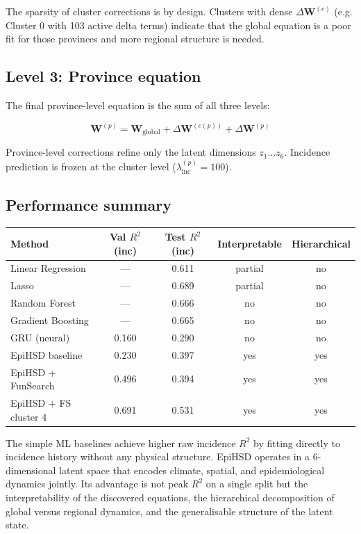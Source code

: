 \documentclass{article}
\begin{document}
The sparsity of cluster corrections is by design. Clusters with dense $\Delta\mathbf{W}^{(c)}$
(e.g. Cluster 0 with 103 active delta terms) indicate that the global equation is a poor
fit for those provinces and more regional structure is needed.

\subsection*{Level 3: Province equation}

The final province-level equation is the sum of all three levels:

\begin{equation}
    \mathbf{W}^{(p)}
    = \mathbf{W}_{\text{global}}
    + \Delta\mathbf{W}^{(c(p))}
    + \Delta\mathbf{W}^{(p)}
\end{equation}

Province-level corrections refine only the latent dimensions $z_1\ldots z_6$.
Incidence prediction is frozen at the cluster level ($\lambda_{\text{inc}}^{(p)} = 100$).

\subsection*{Performance summary}

\begin{center}
\begin{tabular}{lcccc}
\toprule
Method & Val $R^2$ (inc) & Test $R^2$ (inc) & Interpretable & Hierarchical \\
\midrule
Linear Regression    & ---   & 0.611 & partial & no \\
Lasso                & ---   & 0.689 & partial & no \\
Random Forest        & ---   & 0.666 & no      & no \\
Gradient Boosting    & ---   & 0.665 & no      & no \\
GRU (neural)         & 0.160 & 0.290 & no      & no \\
EpiHSD baseline      & 0.230 & 0.397 & yes     & yes \\
EpiHSD + FunSearch   & 0.496 & 0.394 & yes     & yes \\
EpiHSD + FS cluster 4 & 0.691 & 0.531 & yes    & yes \\
\bottomrule
\end{tabular}
\end{center}

The simple ML baselines achieve higher raw incidence $R^2$ by fitting directly
to incidence history without any physical structure.
EpiHSD operates in a 6-dimensional latent space that encodes climate, spatial,
and epidemiological dynamics jointly. Its advantage is not peak $R^2$ on a single split
but the interpretability of the discovered equations, the hierarchical decomposition
of global versus regional dynamics, and the generalisable structure of the latent state.
\end{document}
